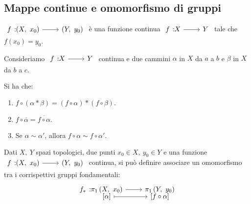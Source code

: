 \subsection{Mappe continue e omomorfismo di gruppi}
\begin{notate}
	$\funz{f}{\left(X,\ x_0\right)}{\left(Y,\ y_0\right)}$ è una funzione continua $\funz{f}{X}{Y}$ tale che $f\left(x_0\right)=y_0$.
\end{notate}
\begin{observe}
Consideriamo $\funz{f}{X}{Y}$ continua e due cammini $\alpha$ in $X$ da $a$ a $b$ e $\beta$ in $X$ da $b$ a $c$.
\begin{center}
\end{center}
Si ha che:
\begin{enumerate}
\item $f\circ \left(\alpha\ast\beta\right)=\left(f\circ\alpha\right)\ast\left(f\circ \beta\right)$.
\item $f\circ\overline{\alpha}=\overline{f\circ\alpha}$.
\item Se $\alpha\sim\alpha'$, allora $f\circ\alpha\sim f\circ\alpha'$.
\end{enumerate}
\vspace{-3mm}
\end{observe}
\begin{proposition}
	Dati $X,\ Y$ spazi topologici, due punti $x_0\in X,\ y_0\in Y$ e una funzione $\funz{f}{\left(X,\ x_0\right)}{\left(Y,\ y_0\right)}$ continua, si può definire associare un omomorfismo tra i corrispettivi gruppi fondamentali:
	\begin{equation}
		\funztot{f_{\ast}}{\gruf{X}{x_0}}{\gruf{Y}{y_0}}{\left[\alpha\right]}{\left[f\circ\alpha\right]}
	\end{equation}
\vspace{-6mm}
\end{proposition}
